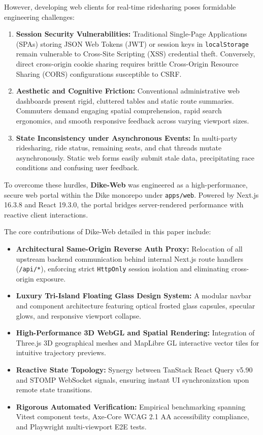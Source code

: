 \documentclass[conference,10pt,a4paper]{IEEEtran}
\begin{document}
However, developing web clients for real-time ridesharing poses formidable engineering challenges:
\begin{enumerate}
    \item \textbf{Session Security Vulnerabilities:} Traditional Single-Page Applications (SPAs) storing JSON Web Tokens (JWT) or session keys in \texttt{localStorage} remain vulnerable to Cross-Site Scripting (XSS) credential theft. Conversely, direct cross-origin cookie sharing requires brittle Cross-Origin Resource Sharing (CORS) configurations susceptible to CSRF.
    \item \textbf{Aesthetic and Cognitive Friction:} Conventional administrative web dashboards present rigid, cluttered tables and static route summaries. Commuters demand engaging spatial comprehension, rapid search ergonomics, and smooth responsive feedback across varying viewport sizes.
    \item \textbf{State Inconsistency under Asynchronous Events:} In multi-party ridesharing, ride status, remaining seats, and chat threads mutate asynchronously. Static web forms easily submit stale data, precipitating race conditions and confusing user feedback.
\end{enumerate}

To overcome these hurdles, \textbf{Dike-Web} was engineered as a high-performance, secure web portal within the Dike monorepo under \texttt{apps/web}. Powered by Next.js 16.3.8 and React 19.3.0, the portal bridges server-rendered performance with reactive client interactions.

The core contributions of Dike-Web detailed in this paper include:
\begin{itemize}
    \item \textbf{Architectural Same-Origin Reverse Auth Proxy:} Relocation of all upstream backend communication behind internal Next.js route handlers (\texttt{/api/*}), enforcing strict \texttt{HttpOnly} session isolation and eliminating cross-origin exposure.
    \item \textbf{Luxury Tri-Island Floating Glass Design System:} A modular navbar and component architecture featuring optical frosted glass capsules, specular glows, and responsive viewport collapse.
    \item \textbf{High-Performance 3D WebGL and Spatial Rendering:} Integration of Three.js 3D geographical meshes and MapLibre GL interactive vector tiles for intuitive trajectory previews.
    \item \textbf{Reactive State Topology:} Synergy between TanStack React Query v5.90 and STOMP WebSocket signals, ensuring instant UI synchronization upon remote state transitions.
    \item \textbf{Rigorous Automated Verification:} Empirical benchmarking spanning Vitest component tests, Axe-Core WCAG 2.1 AA accessibility compliance, and Playwright multi-viewport E2E tests.
\end{itemize}
\end{document}
